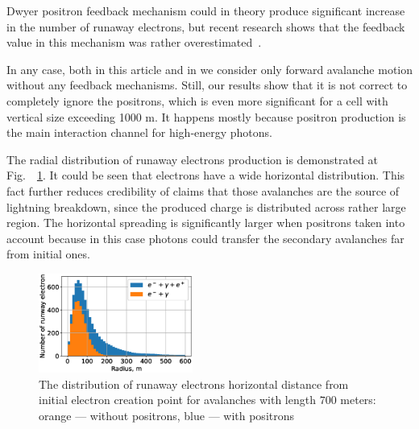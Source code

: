 \documentclass[doublecol,linenumbers]{epl2} %
\begin{document}
Dwyer positron feedback mechanism \cite{Dwyer2012feedback} could in theory produce significant increase in the number of runaway electrons, but recent research shows that the feedback value in this mechanism was rather overestimated~\cite{npmdwyer}.

In any case, both in this article and in \cite{Oreshkin_2018} we consider only forward avalanche motion without any feedback mechanisms. Still, our results show that it is not correct to completely ignore the positrons, which is even more significant for a cell with vertical size exceeding 1000 m. It happens mostly because positron production is the main interaction channel for high-energy photons. 

The radial distribution of runaway electrons production is demonstrated at Fig.~~\ref{fig:rad}. It could be seen that electrons have a wide horizontal distribution. This fact further reduces credibility of claims that those avalanches are the source of lightning breakdown, since the produced charge is distributed across rather large region. The horizontal spreading is significantly larger when  positrons taken into account because in this case photons could transfer the secondary avalanches far from initial ones.

\begin{figure}[h]
    \centering
    \includegraphics[width=0.45\textwidth]{figures/radial.eps}
    \caption{The distribution of runaway electrons horizontal distance from initial electron creation point for avalanches with length $700$ meters: orange --- without positrons, blue --- with positrons}
    \label{fig:rad}
\end{figure}
\end{document}
